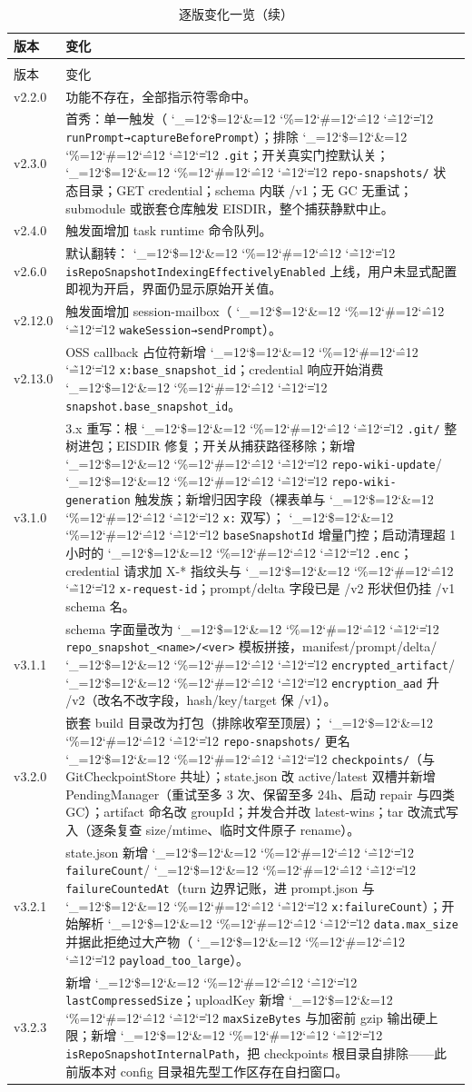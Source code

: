 \documentclass[11pt,a4paper,fontset=none]{ctexart}
\newcommand{\cid}{%
  \begingroup
  \catcode`\_=12\relax \catcode`\$=12\relax \catcode`\&=12\relax
  \catcode`\%=12\relax \catcode`\#=12\relax \catcode`\^=12\relax
  \catcode`\~=12\relax \catcode`\|=12\relax
  \codeSpan}
\newcommand{\codeSpan}[1]{{\small\texttt{#1}}\endgroup}
\begin{document}
\begin{longtable}{@{}p{2.2cm}p{13.0cm}@{}}
\caption{逐版变化一览}\label{tab:timeline}\\
\toprule
版本 & 变化 \\
\midrule
\endfirsthead
\caption[]{逐版变化一览（续）}\\
\toprule
版本 & 变化 \\
\midrule
\endhead
\bottomrule
\endfoot
v2.2.0 & 功能不存在，全部指示符零命中。 \\
v2.3.0 & 首秀：单一触发（\cid{runPrompt→captureBeforePrompt}）；排除 \cid{.git}；开关真实门控默认关；\cid{repo-snapshots/} 状态目录；GET credential；schema 内联 /v1；无 GC 无重试；submodule 或嵌套仓库触发 EISDIR，整个捕获静默中止。 \\
v2.4.0 & 触发面增加 task runtime 命令队列。 \\
v2.6.0 & 默认翻转：\cid{isRepoSnapshotIndexingEffectivelyEnabled} 上线，用户未显式配置即视为开启，界面仍显示原始开关值。 \\
v2.12.0 & 触发面增加 session-mailbox（\cid{wakeSession→sendPrompt}）。 \\
v2.13.0 & OSS callback 占位符新增 \cid{x:base_snapshot_id}；credential 响应开始消费 \cid{snapshot.base_snapshot_id}。 \\
v3.1.0 & 3.x 重写：根 \cid{.git/} 整树进包；EISDIR 修复；开关从捕获路径移除；新增 \cid{repo-wiki-update}/\cid{repo-wiki-generation} 触发族；新增归因字段（裸表单与 \cid{x:} 双写）；\cid{baseSnapshotId} 增量门控；启动清理超 1 小时的 \cid{.enc}；credential 请求加 X-* 指纹头与 \cid{x-request-id}；prompt/delta 字段已是 /v2 形状但仍挂 /v1 schema 名。 \\
v3.1.1 & schema 字面量改为 \cid{repo_snapshot_<name>/<ver>} 模板拼接，manifest/prompt/delta/\cid{encrypted_artifact}/\cid{encryption_aad} 升 /v2（改名不改字段，hash/key/target 保 /v1）。 \\
v3.2.0 & 嵌套 build 目录改为打包（排除收窄至顶层）；\cid{repo-snapshots/} 更名 \cid{checkpoints/}（与 GitCheckpointStore 共址）；state.json 改 active/latest 双槽并新增 PendingManager（重试至多 3 次、保留至多 24h、启动 repair 与四类 GC）；artifact 命名改 groupId；并发合并改 latest-wins；tar 改流式写入（逐条复查 size/mtime、临时文件原子 rename）。 \\
v3.2.1 & state.json 新增 \cid{failureCount}/\cid{failureCountedAt}（turn 边界记账，进 prompt.json 与 \cid{x:failureCount}）；开始解析 \cid{data.max_size} 并据此拒绝过大产物（\cid{payload_too_large}）。 \\
v3.2.3 & 新增 \cid{lastCompressedSize}；uploadKey 新增 \cid{maxSizeBytes} 与加密前 gzip 输出硬上限；新增 \cid{isRepoSnapshotInternalPath}，把 checkpoints 根目录自排除——此前版本对 config 目录祖先型工作区存在自扫窗口。 \\

\end{longtable}
\end{document}
